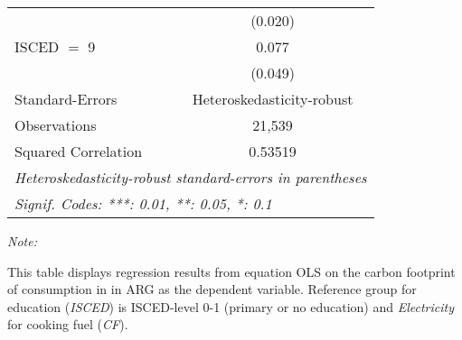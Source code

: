 \begin{table}[htbp!]
\begin{adjustbox}{width = 1\textwidth, max height = 0.95\textheight, center}
\begin{threeparttable}[b]
\begin{tabular}{lc}
                                & (0.020)\\   
            ISCED $=$ 9         & 0.077\\   
                                & (0.049)\\   
            \midrule 
            Standard-Errors     & Heteroskedasticity-robust \\   
            Observations        & 21,539\\  
            Squared Correlation & 0.53519\\  
            \midrule \midrule
            \multicolumn{2}{l}{\emph{Heteroskedasticity-robust standard-errors in parentheses}}\\
            \multicolumn{2}{l}{\emph{Signif. Codes: ***: 0.01, **: 0.05, *: 0.1}}\\
         \end{tabular}
         
         \begin{tablenotes}\item \medskip \textit{Note:}
            \item This table displays regression results from equation OLS on the carbon footprint of consumption in  in ARG as the dependent variable.  Reference group for education (\textit{ISCED}) is ISCED-level 0-1 (primary or no education) and \textit{Electricity} for cooking fuel (\textit{CF}).
         \end{tablenotes}
      \end{threeparttable}
   \end{adjustbox}
\end{table}


